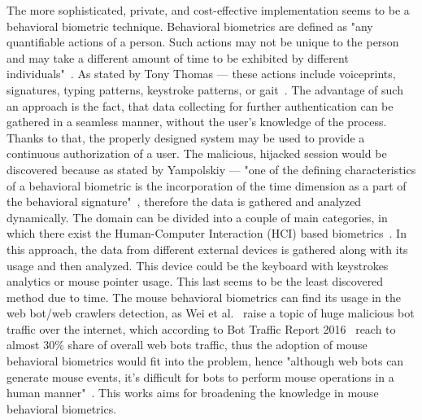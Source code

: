 The more sophisticated, private, and cost-effective implementation seems to be a behavioral biometric technique.
Behavioral biometrics are defined as "any quantifiable actions of a person. Such actions may not be unique to the person and may take a different amount of time to be exhibited by different individuals"~\cite{Yampolskiy2011}.
As stated by Tony Thomas --- these actions include voiceprints, signatures, typing patterns, keystroke patterns, or gait~\cite{thomas2020machine}.
The advantage of such an approach is the fact, that data collecting for further authentication can be gathered in a seamless manner, without the user's knowledge of the process.
Thanks to that, the properly designed system may be used to provide a continuous authorization of a user.
The malicious, hijacked session would be discovered because as stated by Yampolskiy --- "one of the defining characteristics of a behavioral biometric is the incorporation of the time dimension as a part of the behavioral signature"~\cite{Yampolskiy2011}, therefore the data is gathered and analyzed dynamically.
The domain can be divided into a couple of main categories, in which there exist the Human-Computer Interaction (HCI) based biometrics~\cite{Yampolskiy2011}.
In this approach, the data from different external devices is gathered along with its usage and then analyzed.
This device could be the keyboard with keystrokes analytics or mouse pointer usage.
This last seems to be the least discovered method due to time.
The mouse behavioral biometrics can find its usage in the web bot/web crawlers detection, as Wei et al.~\cite{a-deep-learning-approach-to-web-bot-detection-using-mouse-behavioral-biometrics} raise a topic of huge malicious bot traffic over the internet, which according to Bot Traffic Report 2016~\cite{bot-share-2016} reach to almost 30\% share of overall web bots traffic, thus the adoption of mouse behavioral biometrics would fit into the problem, hence "although web bots can
generate mouse events, it’s difficult for bots to perform mouse operations in a human manner"~\cite{a-deep-learning-approach-to-web-bot-detection-using-mouse-behavioral-biometrics}.
This works aims for broadening the knowledge in mouse behavioral biometrics.